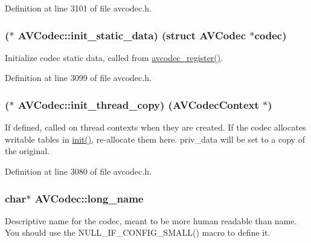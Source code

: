 Definition at line 3101 of file avcodec.\+h.

\subsubsection[{\texorpdfstring{init\+\_\+static\+\_\+data}{init_static_data}}]{($\ast$ A\+V\+Codec\+::init\+\_\+static\+\_\+data) (struct {\bf A\+V\+Codec} $\ast$codec)}\hypertarget{struct_a_v_codec_a47f02232b1793c788132d0ca0fd2252a}{}\label{struct_a_v_codec_a47f02232b1793c788132d0ca0fd2252a}
Initialize codec static data, called from \hyperlink{group__lavc__core_ga882513208349dbcea177626d9fd7ed92}{avcodec\+\_\+register()}. 

Definition at line 3099 of file avcodec.\+h.

\subsubsection[{\texorpdfstring{init\+\_\+thread\+\_\+copy}{init_thread_copy}}]{($\ast$ A\+V\+Codec\+::init\+\_\+thread\+\_\+copy) ({\bf A\+V\+Codec\+Context} $\ast$)}\hypertarget{struct_a_v_codec_a7f9ba73a1d649c453a34b33d15ad99c3}{}\label{struct_a_v_codec_a7f9ba73a1d649c453a34b33d15ad99c3}
If defined, called on thread contexts when they are created. If the codec allocates writable tables in \hyperlink{struct_a_v_codec_a76f222be1221210dadda60e4fce08e80}{init()}, re-\/allocate them here. priv\+\_\+data will be set to a copy of the original. 

Definition at line 3080 of file avcodec.\+h.

\subsubsection[{\texorpdfstring{long\+\_\+name}{long_name}}]{ char$\ast$ A\+V\+Codec\+::long\+\_\+name}\hypertarget{struct_a_v_codec_acb4afcfce3b6541ed70aa7f21d507422}{}\label{struct_a_v_codec_acb4afcfce3b6541ed70aa7f21d507422}
Descriptive name for the codec, meant to be more human readable than name. You should use the N\+U\+L\+L\+\_\+\+I\+F\+\_\+\+C\+O\+N\+F\+I\+G\+\_\+\+S\+M\+A\+L\+L() macro to define it. 

